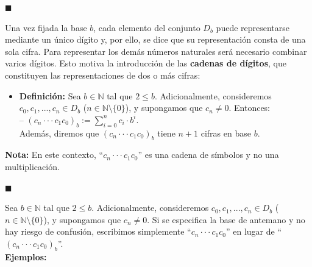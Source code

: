 \documentclass[10 pt]{article}
\begin{document}
\begin{flushright}
    $\blacksquare$
\end{flushright}

\Large{Una vez fijada la base $b$, cada elemento del conjunto $D_b$ puede representarse mediante un único dígito y, por ello, se dice que su representación consta de una sola cifra. Para representar los demás números naturales será necesario combinar varios dígitos. Esto motiva la introducción de las \textbf{cadenas de dígitos}, que constituyen las representaciones de dos o más cifras:} \\

\begin{itemize}
\item \Large{\textbf{Definición:} Sea $b \in \mathbb N$ tal que $2 \leq b$. Adicionalmente, consideremos $c_0,c_1,...,c_n \in D_b$ ($n \in \mathbb N \setminus \{0\}$), y supongamos que $c_n \neq 0$. Entonces: \\

-- $(c_n \cdot \cdot \cdot c_1c_0)_b:=\displaystyle \sum_{i=0}^nc_i \cdot b^i$. \\

Además, diremos que $(c_n \cdot \cdot \cdot c_1c_0)_b$ tiene $n+1$ cifras en base $b$.} \\
\end{itemize}

\Large{\textbf{Nota:} En este contexto, ``$c_n \cdot \cdot \cdot c_1c_0$'' es una cadena de símbolos y no una multiplicación.} \\

\begin{flushright}
    $\blacksquare$
\end{flushright}

\Large{Sea $b \in \mathbb N$ tal que $2 \leq b$. Adicionalmente, consideremos $c_0,c_1,...,c_n \in D_b$ ($n \in \mathbb N \setminus \{0\}$), y supongamos que $c_n \neq 0$. Si se especifica la base de antemano y no hay riesgo de confusión, escribimos simplemente ``$c_n \cdot \cdot \cdot c_1c_0$'' en lugar de ``$(c_n \cdot \cdot \cdot c_1c_0)_b$''.} \\

\Large{\textbf{Ejemplos:}} \\
\end{document}
